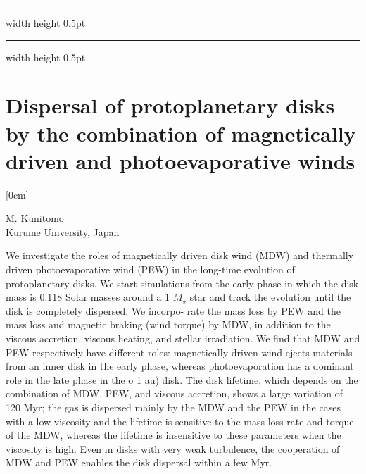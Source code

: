 \documentclass[a4paper,11pt]{book}
\def\doubleline{
\hrule width \hsize height 0.5pt  \kern 1mm \hrule width \hsize height 0.5pt 
}
\begin{document}
\noindent\doubleline
        
          \section[Dispersal of protoplanetary disks by the combination of magnetically driven and photoevaporative winds \newline(M. Kunitomo)] { Dispersal of protoplanetary disks by the combination of magnetically driven and photoevaporative winds }



[0cm]



\begin{center}
    
{\large M. Kunitomo}\\
  
\vspace{2 mm}
\noindent Kurume University, Japan\\

\end{center}



  
\vspace{2 mm}
\noindent We investigate the roles of magnetically driven disk wind (MDW) and thermally driven photoevaporative wind (PEW) in the long-time evolution of protoplanetary disks. We start simulations from the early phase in which the disk mass is 0.118 Solar masses around a 1 $M_\star$ star and track the evolution until the disk is completely dispersed. We incorpo- rate the mass loss by PEW and the mass loss and magnetic braking (wind torque) by MDW, in addition to the viscous accretion, viscous heating, and stellar irradiation. We find that MDW and PEW respectively have different roles: magnetically driven wind ejects materials from an inner disk in the early phase, whereas photoevaporation has a dominant role in the late phase in the o 1 au) disk. The disk lifetime, which depends on the combination of MDW, PEW, and viscous accretion, shows a large variation of 120 Myr; the gas is dispersed mainly by the MDW and the PEW in the cases with a low viscosity and the lifetime is sensitive to the mass-loss rate and torque of the MDW, whereas the lifetime is insensitive to these parameters when the viscosity is high. Even in disks with very weak turbulence, the cooperation of MDW and PEW enables the disk dispersal within a few Myr.
\end{document}
